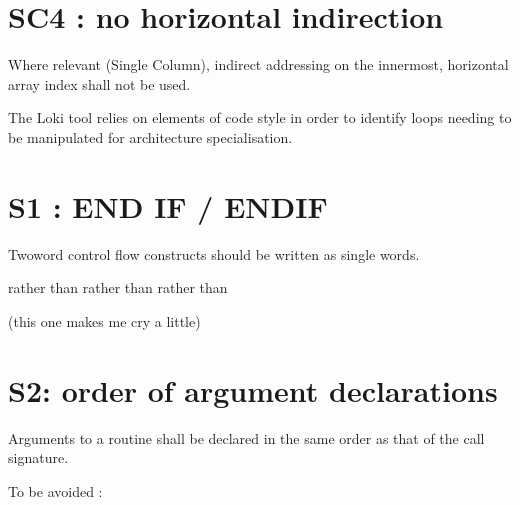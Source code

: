 \documentclass[letterpaper,10pt,english]{sphinxmanual}
\begin{document}
\sphinxstepscope


\section{SC4 : no horizontal indirection}
\label{\detokenize{rules/SC4:sc4-no-horizontal-indirection}}\label{\detokenize{rules/SC4::doc}}
\sphinxAtStartPar
Where relevant (Single Column), indirect addressing on the innermost,
horizontal array index shall not be used.

\sphinxAtStartPar
The Loki tool relies on elements of code style in order to identify loops needing to be manipulated
for architecture specialisation.

\sphinxstepscope


\section{S1 : END IF / ENDIF}
\label{\detokenize{rules/S1:s1-end-if-endif}}\label{\detokenize{rules/S1::doc}}
\sphinxAtStartPar
Two\sphinxhyphen{}word control flow constructs should be written as single words.

\sphinxAtStartPar
{} rather than 
 rather than 
 rather than 

\sphinxAtStartPar
(this one makes me cry a little)

\sphinxstepscope


\section{S2: order of argument declarations}
\label{\detokenize{rules/S2:s2-order-of-argument-declarations}}\label{\detokenize{rules/S2::doc}}
\sphinxAtStartPar
Arguments to a routine shall be declared in the same order as that of the call signature.

\sphinxAtStartPar
To be avoided :
\def\sphinxLiteralBlockLabel{\label{\detokenize{rules/S2:id1}}}
\begin{sphinxVerbatim}[commandchars=\\\{\}]

\end{sphinxVerbatim}
\end{document}
